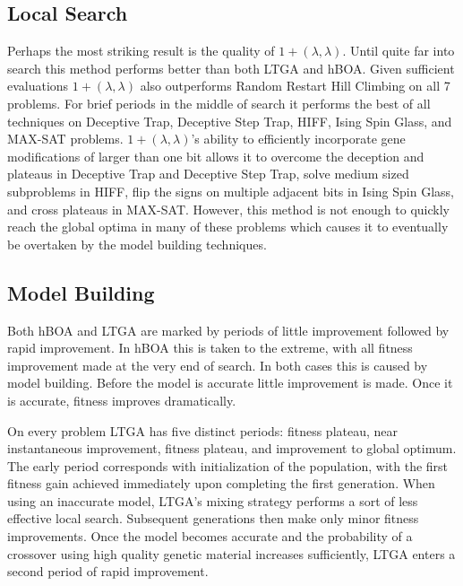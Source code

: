 \documentclass[twoside]{article}
\begin{document}
\subsection{Local Search}
Perhaps the most striking result is the quality of $1+(\lambda, \lambda)$. Until quite far into search this
method performs better than both LTGA and hBOA. Given sufficient evaluations $1+(\lambda, \lambda)$ also outperforms
Random Restart Hill Climbing on all 7 problems. For brief periods in the middle of search it performs the
best of all techniques on Deceptive Trap, Deceptive Step Trap, HIFF, Ising Spin Glass, and MAX-SAT problems.
$1+(\lambda, \lambda)$'s ability to efficiently incorporate gene modifications of larger
than one bit allows it to overcome the deception and plateaus in Deceptive Trap and Deceptive Step Trap, solve medium sized subproblems
in HIFF, flip the signs on multiple adjacent bits in Ising Spin Glass, and cross plateaus in MAX-SAT. However,
this method is not enough to quickly reach the global optima in many of these problems which causes it to eventually
be overtaken by the model building techniques.

\subsection{Model Building}
Both hBOA and LTGA are marked by periods of little improvement followed by rapid improvement.
In hBOA this is taken to the extreme, with all fitness
improvement made at the very end of search. In both cases this is caused by model building. Before the model
is accurate little improvement is made. Once it is accurate, fitness improves dramatically.

On every problem LTGA has five distinct periods: fitness plateau, near instantaneous improvement, fitness plateau,
and improvement to global optimum. The early period corresponds with
initialization of the population, with the first fitness gain achieved immediately upon completing the first generation.
When using an inaccurate model, LTGA's mixing strategy performs a sort of less effective local search.
Subsequent generations then make only minor fitness improvements. Once the model
becomes accurate and the probability of a crossover using high quality genetic material increases sufficiently, LTGA
enters a second period of rapid improvement.

\begin{comment}
This behavior is easiest to understand on the two Trap problems. LTGA's first generation will push individual traps toward a
local optima, but it requires more than a single generation to do so completely. Until that occurs, the model is likely behaving
no better than random as there is little apparent linkage between bits. Once the model begins to identify individual traps, crossover
can begin to increase the frequency of higher fitness trap settings. This process begins slowly as low fitness local optima are more
likely to be chosen for donation than high fitness local optima due to their frequency in the population. The process becomes
self-catalysing as increased frequency of the global optimum trap genes means increased likelihood of the global optimum being spread by crossover.
\end{comment}
\end{document}
